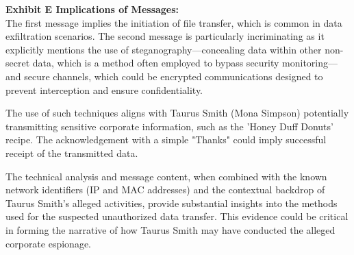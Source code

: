 \textbf{Exhibit E Implications of Messages:}\\
The first message implies the initiation of file transfer, which is common in data exfiltration scenarios. The second message is particularly incriminating as it explicitly mentions the use of steganography—concealing data within other non-secret data, which is a method often employed to bypass security monitoring—and secure channels, which could be encrypted communications designed to prevent interception and ensure confidentiality.

The use of such techniques aligns with Taurus Smith (Mona Simpson) potentially transmitting sensitive corporate information, such as the 'Honey Duff Donuts' recipe. The acknowledgement with a simple "Thanks" could imply successful receipt of the transmitted data.

The technical analysis and message content, when combined with the known network identifiers (IP and MAC addresses) and the contextual backdrop of Taurus Smith's alleged activities, provide substantial insights into the methods used for the suspected unauthorized data transfer. This evidence could be critical in forming the narrative of how Taurus Smith may have conducted the alleged corporate espionage.
